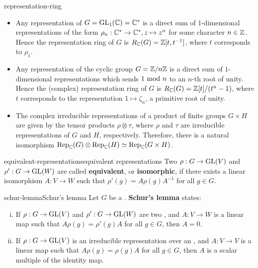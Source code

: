\begin{example}{representation-ring}
    \begin{itemize}
        \item Any representation of $G = \textup{GL}_1(\mathbb{C}) = \mathbb{C}^*$ is a direct sum of $1$-dimensional representations of the form $\rho_n : \mathbb{C}^* \to \mathbb{C}^*, z \mapsto z^n$ for some character $n \in \mathbb{Z}$. Hence the representation ring of $G$ is $R_{\mathbb{C}}(G) = \mathbb{Z}[t, t^{-1}]$, where $t$ corresponds to $\rho_1$.
        
        \item Any representation of the cyclic group $G = \mathbb{Z}/n\mathbb{Z}$ is a direct sum of $1$-dimensional representations which sends $1 \textup{ mod } n$ to an $n$-th root of unity. Hence the (complex) representation ring of $G$ is $R_{\mathbb{C}}(G) = \mathbb{Z}[t]/(t^n - 1)$, where $t$ corresponds to the representation $1 \mapsto \zeta_n$, a primitive root of unity.
        
        \item The complex irreducible representations of a product of finite groups $G \times H$ are given by the tensor products $\rho \otimes \tau$, where $\rho$ and $\tau$ are irreducible representations of $G$ and $H$, respectively. Therefore, there is a natural isomorphism $\textup{Rep}_{\mathbb{C}}(G) \otimes \textup{Rep}_{\mathbb{C}}(H) \simeq \textup{Rep}_{\mathbb{C}}(G \times H)$.
    \end{itemize}
\end{example}

\begin{topic}{equivalent-representations}{equivalent representations}
    Two  $\rho : G \to \textup{GL}(V)$ and $\rho' : G \to \textup{GL}(W)$ are called \textbf{equivalent}, or \textbf{isomorphic}, if there exists a linear isomorphism $A : V \to W$ such that $\rho'(g) = A \rho(g) A^{-1}$ for all $g \in G$.
\end{topic}

\begin{topic}{schur-lemma}{Schur's lemma}
    Let $G$ be a . \textbf{Schur's lemma} states:
    \begin{enumerate}[(i)]
        \item If $\rho : G \to \textup{GL}(V)$ and $\rho' : G \to \textup{GL}(W)$ are two   , and $A : V \to W$ is a linear map such that $A \rho(g) = \rho'(g) A$ for all $g \in G$, then $A = 0$.
        \item If $\rho : G \to \textup{GL}(V)$ is an irreducible representation over an , and $A : V \to V$ is a linear map such that $A \rho(g) = \rho(g) A$ for all $g \in G$, then $A$ is a scalar multiple of the identity map.
    \end{enumerate}
\end{topic}

